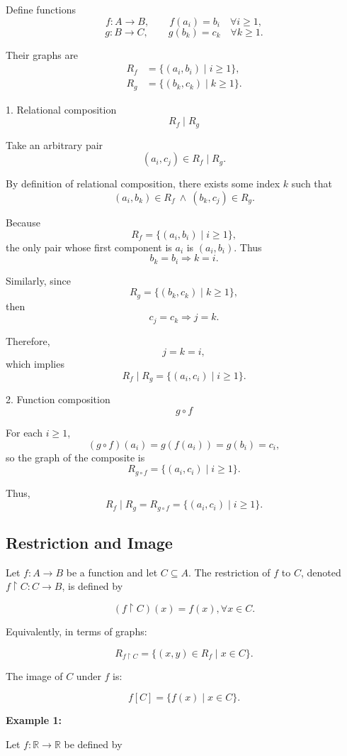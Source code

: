 \documentclass[12pt,a4paper,openany]{article}
\begin{document}
Define functions
\[
f:A\to B,\qquad f(a_i)=b_i \quad\forall i\ge1,
\]
\[
g:B\to C,\qquad g(b_k)=c_k \quad\forall k\ge1.
\]

Their graphs are
\[
\begin{aligned}
R_f &= \{(a_i,b_i)\mid i\ge1\},\\
R_g &= \{(b_k,c_k)\mid k\ge1\}.
\end{aligned}
\]

1. Relational composition
\[
R_f\mid R_g
\]

Take an arbitrary pair
\[
(a_i,c_j)\in R_f\mid R_g.
\]

By definition of relational composition, there exists some index $k$ such that
\[
(a_i,b_k)\in R_f \ \land \  (b_k,c_j)\in R_g.
\]

Because
\[
R_f = \{(a_i,b_i)\mid i\ge1\},
\]
the only pair whose first component is $a_i$ is $(a_i,b_i)$. Thus
\[
b_k = b_i \Rightarrow k=i.
\]

Similarly, since
\[
R_g = \{(b_k,c_k)\mid k\ge1\},
\]
then
\[
c_j = c_k \Rightarrow j=k.
\]

Therefore,
\[
j = k = i,
\]
which implies
\[
R_f \mid R_g = \{(a_i,c_i)\mid i\ge1\}.
\]

2. Function composition
\[
g\circ f
\]

For each $i\ge1$,
\[
(g\circ f)(a_i)=g(f(a_i))=g(b_i)=c_i,
\]
so the graph of the composite is
\[
R_{g\circ f} = \{(a_i,c_i)\mid i\ge1\}.
\]

Thus,
\[
\boxed{R_f\mid R_g = R_{g\circ f} = \{(a_i,c_i)\mid i\ge1\}.}
\]

\subsection{Restriction and Image}

Let $f : A \to B$ be a function and let $C \subseteq A$. The restriction of $f$ to $C$, denoted $f\!\restriction C : C \to B$, 
is defined by

\[
(f\!\restriction C)(x) = f(x), \forall x \in C.
\]

Equivalently, in terms of graphs:

\[
R_{f\!\restriction C} 
= \{ (x, y) \in R_f \mid x \in C \}.
\]

The image of $C$ under $f$ is:

\[
f[C] = \{ f(x) \mid x \in C \}.
\]

\textbf{Example 1:} 

Let $f : \mathbb{R} \to \mathbb{R}$ be defined by
\end{document}
